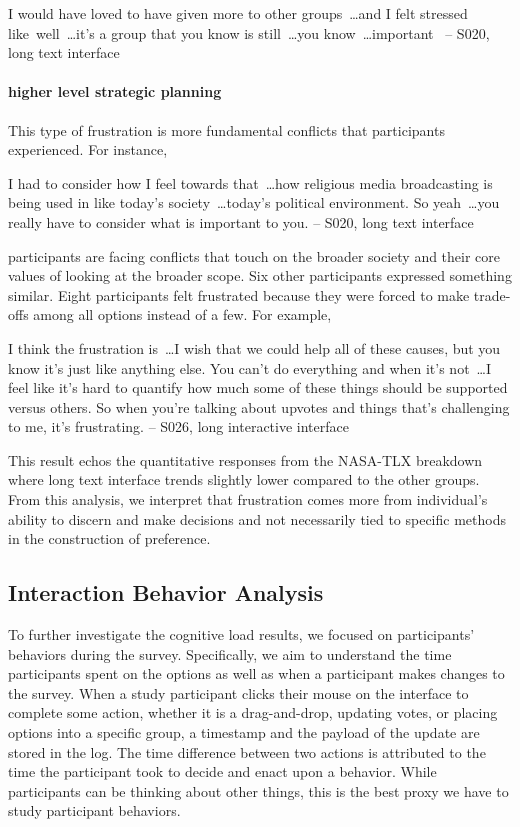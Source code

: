 \begin{displayquote}
I would have loved to have given more to other groups~\ldots and I felt stressed like~\bracketellipsis well~\ldots it's a group that you know is still~\ldots you know~\ldots important~\bracketellipsis
\noindent \hfill -- S020, long text interface
\end{displayquote}

\paragraph{higher level strategic planning} This type of frustration is more fundamental conflicts that participants experienced. For instance, 
\begin{displayquote}
I had to consider how I feel towards that~\ldots how religious media broadcasting is being used in like today's society~\ldots today's political environment. So yeah~\ldots you really have to consider what is important to you. 
\noindent \hfill -- S020, long text interface
\end{displayquote}

participants are facing conflicts that touch on the broader society and their core values of looking at the broader scope. Six other participants expressed something similar. Eight participants felt frustrated because they were forced to make trade-offs among all options instead of a few. For example, 
\begin{displayquote}
I think the frustration is~\ldots I wish that we could help all of these causes, but you know it's just like anything else. You can't do everything and when it's not~\ldots  I feel like it's hard to quantify how much some of these things should be supported versus others. So when you're talking about upvotes and things that's challenging to me, it's frustrating.
\noindent \hfill -- S026, long interactive interface
\end{displayquote}
This result echos the quantitative responses from the NASA-TLX breakdown where long text interface trends slightly lower compared to the other groups. From this analysis, we interpret that frustration comes more from individual's ability to discern and make decisions and not necessarily tied to specific methods in the construction of preference.

\subsection{Interaction Behavior Analysis}
To further investigate the cognitive load results, we focused on participants' behaviors during the survey. Specifically, we aim to understand the time participants spent on the options as well as when a participant makes changes to the survey. When a study participant clicks their mouse on the interface to complete some action, whether it is a drag-and-drop, updating votes, or placing options into a specific group, a timestamp and the payload of the update are stored in the log. The time difference between two actions is attributed to the time the participant took to decide and enact upon a behavior. While participants can be thinking about other things, this is the best proxy we have to study participant behaviors.

